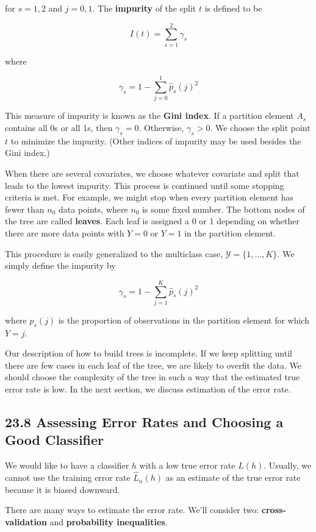 for \(s = 1, 2\) and \(j = 0, 1\). The \textbf{impurity} of the split
\(t\) is defined to be

\[ I(t) = \sum_{s=1}^{2} \gamma_s \]

where

\[ \gamma_s = 1 - \sum_{j=0}^{1} \hat{p}_s(j)^{2} \]

This measure of impurity is known as the \textbf{Gini index}. If a
partition element \(A_s\) contains all 0s or all 1s, then
\(\gamma_s = 0\). Otherwise, \(\gamma_s > 0\). We choose the split point
\(t\) to minimize the impurity. (Other indices of impurity may be used
besides the Gini index.)

When there are several covariates, we choose whatever covariate and
split that leads to the lowest impurity. This process is continued until
some stopping criteria is met. For example, we might stop when every
partition element has fewer than \(n_{0}\) data points, where \(n_{0}\) is
some fixed number. The bottom nodes of the tree are called
\textbf{leaves}. Each leaf is assigned a 0 or 1 depending on whether
there are more data points with \(Y = 0\) or \(Y = 1\) in the partition
element.

This procedure is easily generalized to the multiclass case,
\(\mathcal{Y} = \{ 1, \dots, K \}\). We simply define the impurity by

\[ \gamma_s = 1 - \sum_{j=1}^K \hat{p}_s(j)^{2} \]

where \(\hat{p}_s(j)\) is the proportion of observations in the
partition element for which \(Y = j\).

Our description of how to build trees is incomplete. If we keep
splitting until there are few cases in each leaf of the tree, we are
likely to overfit the data. We should choose the complexity of the tree
in such a way that the estimated true error rate is low. In the next
section, we discuss estimation of the error rate.

\subsection*{23.8 Assessing Error Rates and Choosing a Good Classifier}\label{assessing-error-rates-and-choosing-a-good-classifier}

We would like to have a classifier \(h\) with a low true error rate
\(L(h)\). Usually, we cannot use the training error rate \(\hat{L}_{n}(h)\)
as an estimate of the true error rate because it is biased downward.

There are many ways to estimate the error rate. We'll consider two:
\textbf{cross-validation} and \textbf{probability inequalities}.

